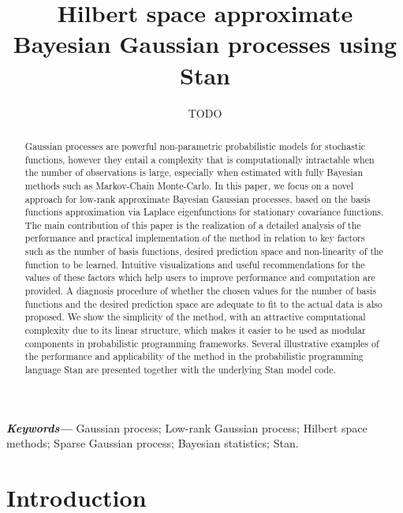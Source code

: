 \documentclass[onecolumn,a4paper,11pt]{article}
\title{Hilbert space approximate Bayesian Gaussian processes using Stan}
\author{TODO}
\date{}
\providecommand{\keywords}[1]
{
  \small	
  \textbf{\textit{Keywords---}} #1
}
\begin{document}
\maketitle

\begin{abstract}
Gaussian processes are powerful non-parametric probabilistic models for stochastic functions, however they entail a complexity that is computationally intractable when the number of observations is large, especially when estimated with fully Bayesian methods such as Markov-Chain Monte-Carlo. In this paper, we focus on a novel approach for low-rank approximate Bayesian Gaussian processes, based on the basis functions approximation via Laplace eigenfunctions for stationary covariance functions. The main contribution of this paper is the realization of a detailed analysis of the performance and practical implementation of the method in relation to key factors such as the number of basis functions, desired prediction space and non-linearity of the function to be learned. Intuitive visualizations and useful recommendations for the values of these factors which help users to improve performance and computation are provided. A diagnosis procedure of whether the chosen values for the number of basis functions and the desired prediction space are adequate to fit to the actual data is also proposed. We show the simplicity of the method, with an attractive computational complexity due to its linear structure, which makes it easier to be used as modular components in probabilistic programming frameworks. Several illustrative examples of the performance and applicability of the method in the probabilistic programming language Stan are presented together with the underlying Stan model code.
\end{abstract}

\keywords{Gaussian process; Low-rank Gaussian process; Hilbert space methods; Sparse Gaussian process; Bayesian statistics; Stan.}


\section{Introduction}\label{sec_bf_intro}
\end{document}
